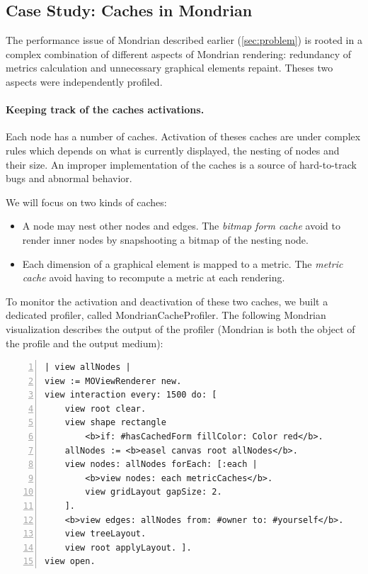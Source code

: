 \documentclass[runningheads]{llncs}
\newcommand{\ab}[1]{\nb{Alexandre}{blue}{#1}}
\newcommand{\jr}[1]{\nb{Jorge}{cyan}{#1}}
\begin{document}
\subsection{Case Study: Caches in Mondrian}


The performance issue of Mondrian described earlier (\autoref{sec:problem}) is rooted in a complex combination of different aspects of Mondrian rendering: redundancy of metrics calculation and unnecessary graphical elements repaint. Theses two aspects were independently profiled.

\paragraph{Keeping track of the caches activations.}
Each node has a number of caches. Activation of theses caches are under complex rules which depends on what is currently displayed, the nesting of nodes and their size. An improper implementation of the caches is a source of hard-to-track bugs and abnormal behavior.

We will focus on two kinds of caches: 
\begin{itemize}
\item A node may nest other nodes and edges. The \emph{bitmap form cache} avoid to render inner nodes by snapshooting a bitmap of the nesting node.
\item Each dimension of a graphical element is mapped to a metric. The \emph{metric cache} avoid having to recompute a metric at each rendering.
\end{itemize}

To monitor the activation and deactivation of these two caches, we built a dedicated profiler, called {\sc MondrianCacheProfiler}. The following Mondrian visualization describes the output of the profiler (Mondrian is both the object of the profile and the output medium):

\begin{lstlisting}[numbers=left]
| view allNodes |
view := MOViewRenderer new.
view interaction every: 1500 do: [
	view root clear.
	view shape rectangle
		<b>if: #hasCachedForm fillColor: Color red</b>.
	allNodes := <b>easel canvas root allNodes</b>.
	view nodes: allNodes forEach: [:each |
		<b>view nodes: each metricCaches</b>.
		view gridLayout gapSize: 2.
	].  
	<b>view edges: allNodes from: #owner to: #yourself</b>.
	view treeLayout.
	view root applyLayout. ].	
view open.
\end{lstlisting}
\end{document}
